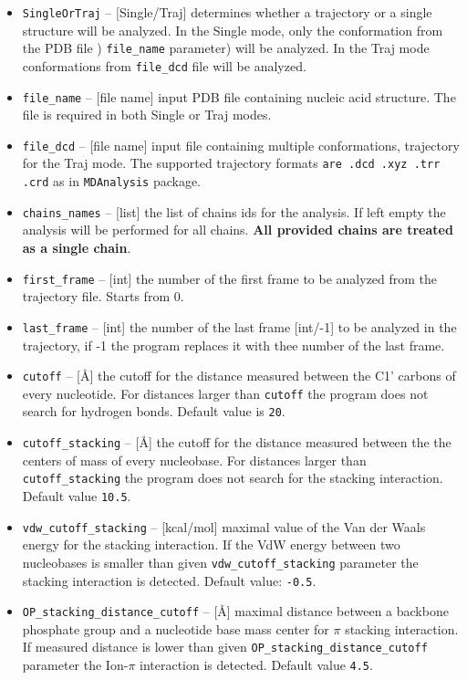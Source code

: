 \documentclass[12pt]{article}
\begin{document}
\begin{itemize}
\item \texttt{SingleOrTraj} -- [Single/Traj] determines whether a trajectory or a single structure will be analyzed. In the Single mode, only the conformation from the PDB file ) \texttt{file\_name} parameter) will be analyzed. In the Traj mode conformations from \texttt{file\_dcd} file will be analyzed. 
\item \texttt{file\_name} -- [file name] input PDB file containing nucleic acid structure. The file is required in both Single or Traj modes.
\item \texttt{file\_dcd} -- [file name] input file containing multiple conformations, trajectory for the Traj mode. The supported trajectory formats \texttt{are .dcd .xyz .trr .crd} as in \texttt{MDAnalysis} package.  
\item \texttt{chains\_names} -- [list] the list of chains ids  for the analysis. If left empty the analysis will be performed for all chains. \textbf{All provided chains are treated as a single chain}.
\item \texttt{first\_frame} -- [int] the number of the first frame to be analyzed from the trajectory file. Starts from 0.
\item \texttt{last\_frame} -- [int] the number of the last frame [int/-1] to be analyzed in the trajectory, if -1 the program replaces it with thee number of the last frame.
\item \texttt{cutoff} -- [\AA] the cutoff for the distance measured between the C1' carbons of every nucleotide. For distances larger than \texttt{cutoff} the program does not search for hydrogen bonds. Default value is \texttt{20}.
\item \texttt{cutoff\_stacking} -- [\AA] the cutoff for the distance  measured between the the centers of mass of every nucleobase. For distances larger than \texttt{cutoff\_stacking} the program does not search for the stacking interaction. Default value \texttt{10.5}.
\item \texttt{vdw\_cutoff\_stacking} --  [kcal/mol] maximal value of the Van der Waals energy for the stacking interaction. If the VdW energy between two nucleobases is smaller than given \texttt{vdw\_cutoff\_stacking} parameter the stacking interaction is detected. Default value: \texttt{-0.5}.
\item \texttt{OP\_stacking\_distance\_cutoff} -- [\AA]  maximal distance between a backbone phosphate group and a nucleotide base mass center for $\pi$ stacking interaction. If measured distance is lower than given \texttt{OP\_stacking\_distance\_cutoff} parameter the Ion-$\pi$ interaction is detected. Default value \texttt{4.5}.

\end{itemize}
\end{document}
